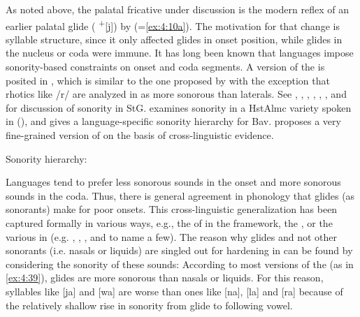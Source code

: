 As noted above, the palatal fricative under discussion is the modern reflex of an earlier palatal glide ( \textsuperscript{+}[j]) by  (=\ref{ex:4:10a}). The motivation for that change is syllable structure, since it only affected glides in onset position, while glides in the nucleus or coda were immune. It has long been known that languages impose sonority-based constraints on onset and coda segments. A version of the  is posited in , which is similar to the one proposed by \citet{Clements1990} with the exception that rhotics like /r/ are analyzed in  as more sonorous than laterals. See \citet{Vennemann1982}, \citet{Strauss1982}, \citet{Wiese1988}, \citet{EisenbergRamersVater1992},  \citet{Wiese1996a}, \citet{Grijzenhout1998}, and \citet{Hall2002} for discussion of sonority in StG. \citet{Hall2011b} examines sonority in a HstAlmc variety spoken in  (), and \citet{Noelliste2019} gives a language-specific sonority hierarchy for Bav. \citet{Parker2011} proposes a very fine-grained version of  on the basis of cross-linguistic evidence.

\ea%
    \label{ex:4:39}Sonority hierarchy:\\
\z 

Languages tend to prefer less sonorous sounds in the onset and more sonorous sounds in the coda. Thus, there is general agreement in phonology that glides (as sonorants) make for poor onsets. This cross-linguistic generalization has been  captured formally in various ways, e.g., the  of \citet{Vennemann1988} in the  framework, the  \citep{Clements1990}, or the various  in  (e.g. \citealt{PrinceSmolensky2004}, \citealt{Clements1997}, \citealt{Smith2003}, and \citealt{Hall2011b} to name a few). The reason why glides and not other sonorants (i.e. nasals or liquids) are singled out for hardening in  can be found by considering the sonority of these sounds: According to most versions of the  (as in \ref{ex:4:39}), glides are more sonorous than nasals or liquids. For this reason, syllables like [ja] and [wa] are worse than ones like [na], [la] and [ra] because of the relatively shallow rise in sonority from glide to following vowel.

